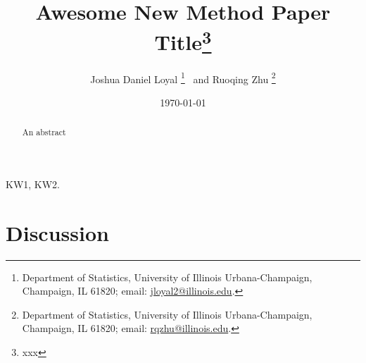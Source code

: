 \documentclass[11pt]{article}
\begin{document}
\title{  {\LARGE Awesome New Method Paper Title}\thanks{xxx}}

\author{
Joshua Daniel Loyal \thanks{Department of Statistics, University of Illinois Urbana-Champaign, Champaign, IL 61820; email: \href{mailto:jloyal2@illinois.edu}{jloyal2@illinois.edu}.} \,
and Ruoqing Zhu \thanks{Department of Statistics, University of Illinois Urbana-Champaign, Champaign, IL 61820; email: \href{mailto:rqzhu@illinois.edu}{rqzhu@illinois.edu}.}
}

\date{\today}
\maketitle

\begin{abstract}
An abstract
\end{abstract}

KW1, KW2.











%

\section{Discussion}\label{sec:disc}



\end{document}
